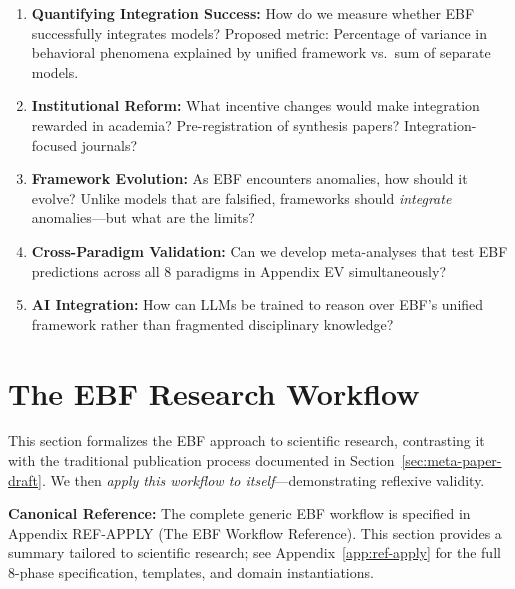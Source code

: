 \begin{enumerate}
    \item \textbf{Quantifying Integration Success:}
    How do we measure whether EBF successfully integrates models? Proposed metric:
    Percentage of variance in behavioral phenomena explained by unified framework vs.\
    sum of separate models.

    \item \textbf{Institutional Reform:}
    What incentive changes would make integration rewarded in academia? Pre-registration
    of synthesis papers? Integration-focused journals?

    \item \textbf{Framework Evolution:}
    As EBF encounters anomalies, how should it evolve? Unlike models that are falsified,
    frameworks should \textit{integrate} anomalies—but what are the limits?

    \item \textbf{Cross-Paradigm Validation:}
    Can we develop meta-analyses that test EBF predictions across all 8 paradigms in
    Appendix EV simultaneously?

    \item \textbf{AI Integration:}
    How can LLMs be trained to reason over EBF's unified framework rather than
    fragmented disciplinary knowledge?
\end{enumerate}



\section{The EBF Research Workflow}
\label{sec:meta-ebf-workflow}

This section formalizes the EBF approach to scientific research, contrasting it with
the traditional publication process documented in Section~\ref{sec:meta-paper-draft}.
We then \textit{apply this workflow to itself}---demonstrating reflexive validity.

\textbf{Canonical Reference:} The complete generic EBF workflow is specified in
Appendix REF-APPLY (The EBF Workflow Reference). This section provides
a summary tailored to scientific research; see Appendix~\ref{app:ref-apply} for
the full 8-phase specification, templates, and domain instantiations.

